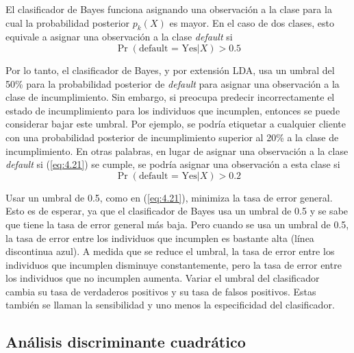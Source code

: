 El clasificador de Bayes funciona asignando una observación a la clase para la cual la probabilidad posterior $p_k(X)$ es mayor. En el caso de dos clases, esto equivale a asignar una observación a la clase \textit{default} si
\begin{equation}
\Pr(\text{default = Yes} | X) > 0.5
\label{eq:4.21}
\end{equation}

Por lo tanto, el clasificador de Bayes, y por extensión LDA, usa un umbral del 50\% para la probabilidad posterior de \textit{default} para asignar una observación a la clase de incumplimiento. Sin embargo, si preocupa predecir incorrectamente el estado de incumplimiento para los individuos que incumplen, entonces se puede considerar bajar este umbral. Por ejemplo, se podría etiquetar a cualquier cliente con una probabilidad posterior de incumplimiento superior al 20\% a la clase de incumplimiento. En otras palabras, en lugar de asignar una observación a la clase \textit{default} si (\ref{eq:4.21}) se cumple, se podría asignar una observación a esta clase si
\begin{equation}
\Pr(\text{default = Yes} | X) > 0.2
\label{eq:4.22}
\end{equation}

Usar un umbral de 0.5, como en (\ref{eq:4.21}), minimiza la tasa de error general. Esto es de esperar, ya que el clasificador de Bayes usa un umbral de 0.5 y se sabe que tiene la tasa de error general más baja. Pero cuando se usa un umbral de 0.5, la tasa de error entre los individuos que incumplen es bastante alta (línea discontinua azul). A medida que se reduce el umbral, la tasa de error entre los individuos que incumplen disminuye constantemente, pero la tasa de error entre los individuos que no incumplen aumenta. Variar el umbral del clasificador cambia su tasa de verdaderos positivos y su tasa de falsos positivos. Estas también se llaman la sensibilidad y uno menos la especificidad del clasificador. \\
\subsection{Análisis discriminante cuadrático}

